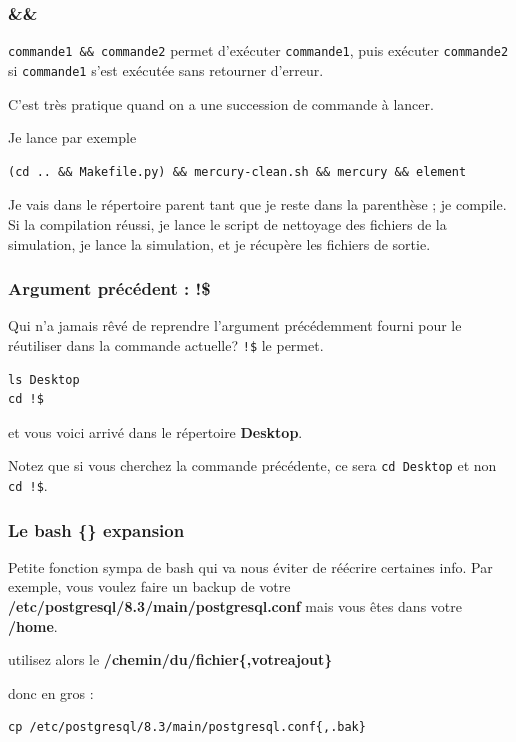 \documentclass[a4paper,twoside]{article}
\begin{document}
\subsubsection{\&\&}
\verb|commande1 && commande2| permet d'exécuter \texttt{commande1}, puis exécuter \texttt{commande2} si \texttt{commande1} s'est exécutée sans retourner d'erreur.

C'est très pratique quand on a une succession de commande à lancer. 

Je lance par exemple 
\begin{verbatim}
(cd .. && Makefile.py) && mercury-clean.sh && mercury && element
\end{verbatim}
Je vais dans le répertoire parent tant que je reste dans la parenthèse ;  je compile. Si la compilation réussi, je lance le script de nettoyage des fichiers de la simulation, je lance la simulation, et je récupère les fichiers de sortie.

\subsubsection{Argument précédent : !\$}

Qui n'a jamais rêvé de reprendre l'argument précédemment fourni pour le réutiliser dans la commande actuelle? \verb|!$| le permet.

\begin{verbatim}
ls Desktop
cd !$
\end{verbatim}

et vous voici arrivé dans le répertoire \textbf{Desktop}.

\begin{remarque}
Notez que si vous cherchez la commande précédente, ce sera \texttt{cd Desktop} et non \verb|cd !$|.
\end{remarque}


\subsubsection{Le bash \{\} expansion}

Petite fonction sympa de bash qui va nous éviter de réécrire certaines info. Par exemple, vous voulez faire un backup de votre \textbf{/etc/postgresql/8.3/main/postgresql.conf} mais vous êtes dans votre \textbf{/home}.

utilisez alors le \textbf{/chemin/du/fichier\{,votreajout\}}

donc en gros :

\begin{verbatim}
cp /etc/postgresql/8.3/main/postgresql.conf{,.bak}
\end{verbatim}
\end{document}
